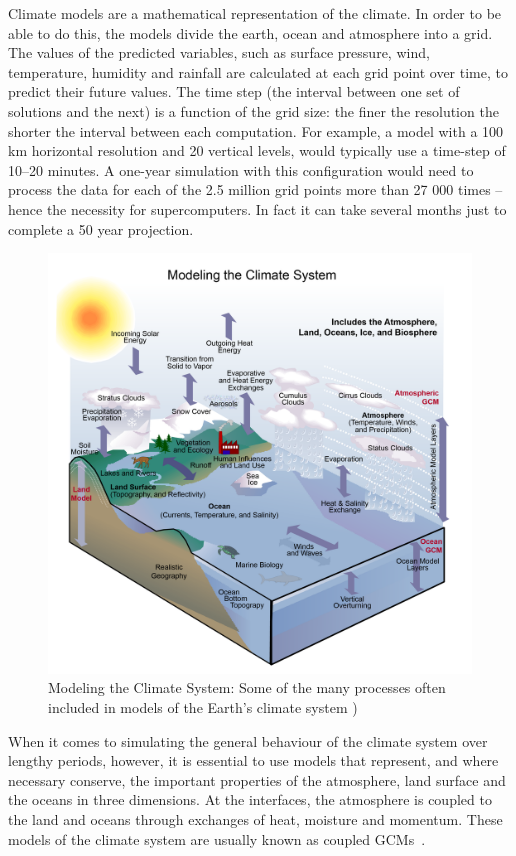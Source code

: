 Climate models are a mathematical representation of the climate. In order to be able to do this, the models divide 
the earth, ocean and atmosphere into a grid. The values of the predicted variables, such as surface pressure, wind, 
temperature, humidity and rainfall are calculated at each grid point over time, to predict their future values. 
The time step (the interval between one set of solutions and the next) is a function of the grid size: the finer the 
resolution the shorter the interval between each computation. For example, a model with a 100 km horizontal resolution 
and 20 vertical levels, would typically use a time-step of 10--20 minutes. A one-year simulation with this configuration 
would need to process the data for each of the 2.5 million grid points more than 27 000 times -- hence the necessity 
for supercomputers. In fact it can take several months just to complete a 50 year projection. 


\begin{figure}[!hp]
    \centering
    \includegraphics[scale=0.6]{pic/APP_modeling_the_climate_V2}
    \caption{Modeling the Climate System: Some of the many processes often included in models of the Earth's climate system \cite{KT2003})}
    \label{fig:schema2}
\end{figure}


When it comes to simulating the general behaviour of the climate system over lengthy periods, however, 
it is essential to use models that represent, and where necessary conserve, the important properties of the 
atmosphere, land surface and the oceans in three dimensions. At the interfaces, the atmosphere is coupled to the land 
and oceans through exchanges of heat, moisture and momentum. These models of the climate system are usually known as coupled \glspl{GCM}~\cite{wmo-models}.

